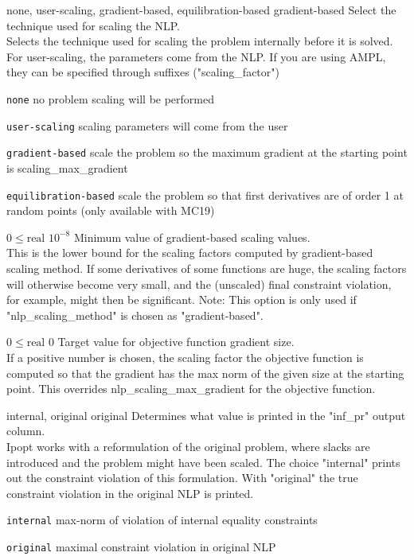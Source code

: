 %
{\ttfamily none, user-scaling, gradient-based, equilibration-based}%
{gradient-based}%
{Select the technique used for scaling the NLP.\\
Selects the technique used for scaling the problem internally before it is solved. For user-scaling, the parameters come from the NLP. If you are using AMPL, they can be specified through suffixes ("scaling\_factor")}%
{\begin{list}{}{
\setlength{\parsep}{0em}
\setlength{\leftmargin}{5ex}
\setlength{\labelwidth}{2ex}
\setlength{\itemindent}{0ex}
\setlength{\topsep}{0pt}}
\item[\texttt{none}] no problem scaling will be performed
\item[\texttt{user-scaling}] scaling parameters will come from the user
\item[\texttt{gradient-based}] scale the problem so the maximum gradient at the starting point is scaling\_max\_gradient
\item[\texttt{equilibration-based}] scale the problem so that first derivatives are of order 1 at random points (only available with MC19)
\end{list}
}

%
{$0\leq\textrm{real}$}%
{$10^{- 8}$}%
{Minimum value of gradient-based scaling values.\\
This is the lower bound for the scaling factors computed by gradient-based scaling method.  If some derivatives of some functions are huge, the scaling factors will otherwise become very small, and the (unscaled) final constraint violation, for example, might then be significant.  Note: This option is only used if "nlp\_scaling\_method" is chosen as "gradient-based".}%
{}

%
{$0\leq\textrm{real}$}%
{$0$}%
{Target value for objective function gradient size.\\
If a positive number is chosen, the scaling factor the objective function is computed so that the gradient has the max norm of the given size at the starting point.  This overrides nlp\_scaling\_max\_gradient for the objective function.}%
{}

%
{\ttfamily internal, original}%
{original}%
{Determines what value is printed in the "inf\_pr" output column.\\
Ipopt works with a reformulation of the original problem, where slacks are introduced and the problem might have been scaled.  The choice "internal" prints out the constraint violation of this formulation. With "original" the true constraint violation in the original NLP is printed.}%
{\begin{list}{}{
\setlength{\parsep}{0em}
\setlength{\leftmargin}{5ex}
\setlength{\labelwidth}{2ex}
\setlength{\itemindent}{0ex}
\setlength{\topsep}{0pt}}
\item[\texttt{internal}] max-norm of violation of internal equality constraints
\item[\texttt{original}] maximal constraint violation in original NLP
\end{list}
}

